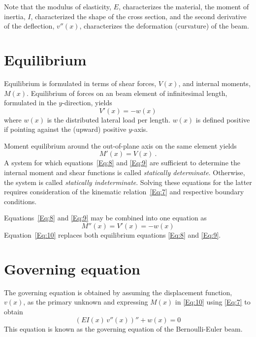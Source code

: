\documentclass[11pt, oneside]{article}   	%
\begin{document}
Note that the modulus of elasticity, $E$, characterizes the material, the moment of inertia, $I$, characterized the shape of the cross section, and the second derivative of the deflection, $v''(x)$, characterizes the deformation (curvature) of the beam.

\section{Equilibrium}
Equilibrium is formulated in terms of shear forces, $V(x)$, and internal moments, $M(x)$.
Equilibrium of forces on an beam element of infinitesimal length, formulated in the $y$-direction, yields
\begin{equation}
	V'(x) = -w(x)
	\label{Eq:8}
\end{equation}
where $w(x)$ is the distributed lateral load per length.  $w(x)$ is defined positive if pointing against the (upward) positive $y$-axis.

Moment equilibrium around the out-of-plane axis on the same element yields
\begin{equation}
	M'(x) = V(x) ~.
	\label{Eq:9}
\end{equation}
A system for which equations~\eqref{Eq:8} and \eqref{Eq:9} are sufficient to determine the internal moment and shear functions is called \emph{statically determinate}. Otherwise, the system is called \emph{statically indeterminate}. Solving these equations for the latter requires consideration of the kinematic relation~\eqref{Eq:7} and respective boundary conditions.

Equations~\eqref{Eq:8} and \eqref{Eq:9} may be combined into one equation as
\begin{equation}
	M''(x) = V'(x)=-w(x)
	\label{Eq:10}
\end{equation}
Equation~\eqref{Eq:10} replaces both equilibrium equations \eqref{Eq:8} and \eqref{Eq:9}.

\section{Governing equation}
The governing equation is obtained by assuming the displacement function, $v(x)$, as the primary unknown and expressing $M(x)$ in \eqref{Eq:10} using \eqref{Eq:7} to obtain
\begin{equation}
	\left( EI(x)\,v''(x) \right)'' + w(x) = 0
	\label{Eq:11}
\end{equation}
This equation is known as the governing equation of the Bernoulli-Euler beam.
\end{document}
